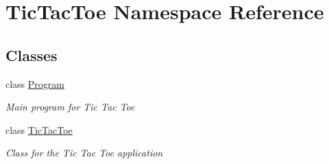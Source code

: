 \hypertarget{namespace_tic_tac_toe}{}\section{Tic\+Tac\+Toe Namespace Reference}
\label{namespace_tic_tac_toe}
\subsection*{Classes}
\begin{DoxyCompactItemize}
\item 
class \hyperlink{class_tic_tac_toe_1_1_program}{Program}
\begin{DoxyCompactList}\small\item\em Main program for Tic Tac Toe \end{DoxyCompactList}\item 
class \hyperlink{class_tic_tac_toe_1_1_tic_tac_toe}{Tic\+Tac\+Toe}
\begin{DoxyCompactList}\small\item\em Class for the Tic Tac Toe application \end{DoxyCompactList}\end{DoxyCompactItemize}

